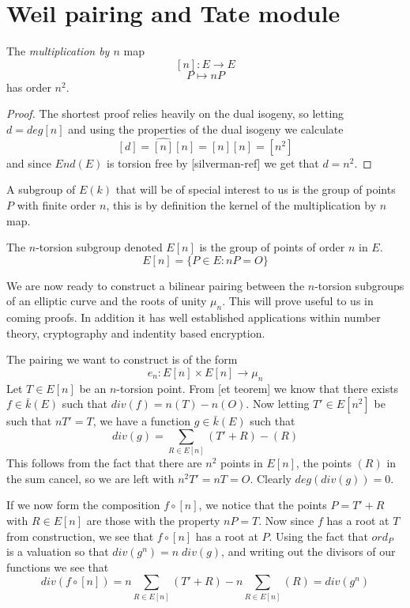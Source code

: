 \section{Weil pairing and Tate module}

\begin{prop}
 The \emph{multiplication by $n$} map
$$ [n] : E \rightarrow E $$
$$ P \mapsto nP $$
has order $n^2$.
\end{prop}
\begin{proof}
The shortest proof relies heavily on the dual isogeny, so letting $d = deg [n]$ and using the properties of 
the dual isogeny we calculate
$$ [d] = \widehat{[n]}[n] = [n][n] = [n^2] $$
and since $End(E)$ is torsion free by [silverman-ref] we get that $d = n^2$.
\end{proof}

A subgroup of $E(k)$ that will be of special interest to us is the group of points $P$
with finite order $n$, this is by definition the kernel of the multiplication by $n$ map.
\begin{mydef}
 The $n$-torsion subgroup denoted $E[n]$ is the group of points of order $n$ in $E$.
$$ E[n] = \{ P\in E : nP = O \} $$
\end{mydef}

We are now ready to construct a bilinear pairing between the $n$-torsion subgroups of
an elliptic curve and the roots of unity $\mu_n$. This will prove useful to us in coming
proofs. In addition it has well established applications within number theory, cryptography
and indentity based encryption.

The pairing we want to construct is of the form
$$ e_n : E[n] \times E[n] \rightarrow \mu_n $$
Let $T\in E[n]$ be an $n$-torsion point. From [et teorem] we know that there exists
$f \in \bar{k}(E)$ such that $div(f) = n(T) - n(O)$. Now letting $T' \in E[n^2]$ be such
that $nT' = T$, we have a function $g \in \bar{k}(E)$ such that
$$ div(g) = \sum_{R\in E[n]} (T'+R)-(R) $$
This follows from the fact that there are $n^2$ points in $E[n]$, the points $(R)$ in the
sum cancel, so we are left with $n^2 T' = nT = O$. Clearly $deg(div(g)) = 0$.

If we now form the composition $f \circ [n]$, we notice that the points $P = T' + R$ with
$R\in E[n]$ are those with the property $nP = T$. Now since $f$ has a root at $T$ from
construction, we see that $f \circ [n]$ has a root at $P$. Using the fact that $ord_P$ is a valuation
so that $div(g^n) = n\;div(g)$, and writing out the divisors of our functions we see that
$$ div(f \circ [n]) = n\sum_{R\in E[n]} (T'+R) - n\sum_{R\in E[n]} (R) = div(g^n) $$

